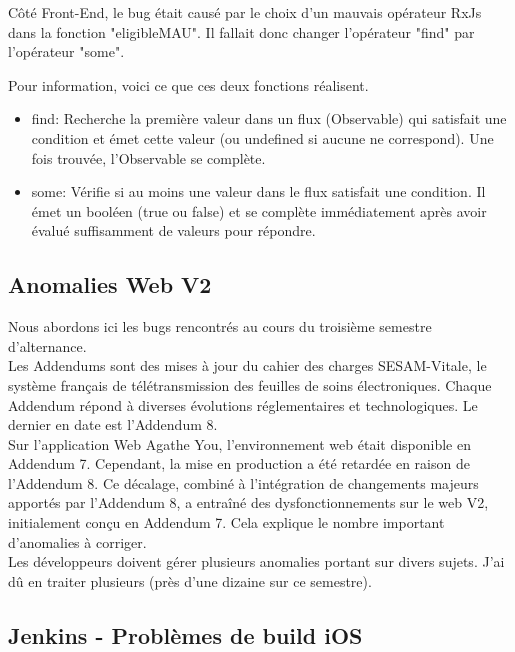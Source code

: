 \documentclass{article}
\begin{document}
Côté Front-End, le bug était causé par le choix d'un mauvais opérateur RxJs dans la fonction "eligibleMAU". Il fallait donc changer l'opérateur "find" par l'opérateur "some".

Pour information, voici ce que ces deux fonctions réalisent.

\begin{itemize}
    \item find: Recherche la première valeur dans un flux (Observable) qui satisfait une condition et émet cette valeur (ou undefined si aucune ne correspond). Une fois trouvée, l'Observable se complète.
    \item some: Vérifie si au moins une valeur dans le flux satisfait une condition. Il émet un booléen (true ou false) et se complète immédiatement après avoir évalué suffisamment de valeurs pour répondre.
\end{itemize}

\subsection{Anomalies Web V2}

Nous abordons ici les bugs rencontrés au cours du troisième semestre d'alternance.\\



Les Addendums sont des mises à jour du cahier des charges SESAM-Vitale, le système français de télétransmission des feuilles de soins électroniques. Chaque Addendum répond à diverses évolutions réglementaires et technologiques. Le dernier en date est l'Addendum 8. \\

Sur l'application Web Agathe You, l'environnement web était disponible en Addendum 7. Cependant, la mise en production a été retardée en raison de l'Addendum 8. Ce décalage, combiné à l'intégration de changements majeurs apportés par l'Addendum 8, a entraîné des dysfonctionnements sur le web V2, initialement conçu en Addendum 7. Cela explique le nombre important d'anomalies à corriger. \\

Les développeurs doivent gérer plusieurs anomalies portant sur divers sujets. J'ai dû en traiter plusieurs (près d'une dizaine sur ce semestre).

\subsection{Jenkins - Problèmes de build iOS}
\end{document}
